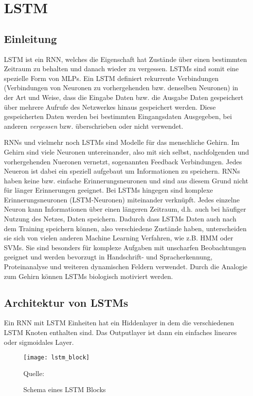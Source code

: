 \section{\acl{LSTM}}

\subsection{Einleitung}
\ac{LSTM} ist ein \ac{RNN}, welches die Eigenschaft hat Zustände über einen
bestimmten Zeitraum zu behalten und danach wieder zu vergessen. \acp{LSTM} sind
somit eine spezielle Form von \acp{MLP}. Ein \ac{LSTM} definiert rekurrente
Verbindungen (Verbindungen von Neuronen zu vorhergehenden bzw. denselben
Neuronen) in der Art und Weise, dass die Eingabe Daten bzw.
die Ausgabe Daten gespeichert über mehrere Aufrufe des Netzwerkes hinaus
gespeichert werden. Diese gespeicherten Daten werden bei bestimmten
Eingangsdaten Ausgegeben, bei anderen \textit{vergessen} bzw. überschrieben oder
nicht verwendet. 
 
\acp{RNN} und vielmehr noch \acp{LSTM} sind Modelle für das menschliche Gehirn.
Im Gehirn sind viele Neuronen untereinander, also mit sich selbst, nachfolgenden
und vorhergehenden Nueronen vernetzt, sogenannten Feedback Verbindungen. Jedes
Neueron ist dabei ein speziell aufgebaut um Informationen zu speichern.
\acp{RNN} haben keine bzw. einfache Erinnerungsneuronen und sind aus diesem
Grund nicht für länger Erinnerungen geeignet. Bei \acp{LSTM} hingegen sind
komplexe Erinnerungsneuronen (\ac{LSTM}-Neuronen) miteinander verknüpft. Jedes
einzelne Neuron kann Informationen über einen längeren Zeitraum, d.h. auch bei
häufiger Nutzung des Netzes, Daten speichern. Dadurch dass \acp{LSTM} Daten auch
nach dem Training speichern können, also verschiedene Zustände haben,
unterscheiden sie sich von vielen anderen Machine Learning Verfahren, wie z.B.
\ac{HMM} oder \acp{SVM}. Sie sind besonders für komplexe Aufgaben mit unscharfen
Beobachtungen geeignet und werden bevorzugt in Handschrift- und Spracherkennung,
Proteinanalyse und weiteren dynamischen Feldern verwendet. Durch die Analogie
zum Gehirn können \acp{LSTM} biologisch motiviert werden.
 
\subsection{Architektur von \aclp{LSTM}}
Ein \ac{RNN} mit \ac{LSTM} Einheiten hat ein Hiddenlayer in dem die
verschiedenen \ac{LSTM} Knoten enthalten sind. Das Outputlayer ist dann ein
einfaches lineares oder sigmoidales Layer.  
\begin{figure}[h]
	\begin{center}
	\texttt{[image: lstm\_block]}
	\caption{Schema eines \acs{LSTM} Blocks}
	Quelle: \cite{WIKI2013}
	\label{fig:lstm_block}
	\end{center}
\end{figure}


